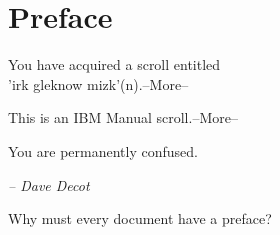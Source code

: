 

\chapter*{Preface}

\begin{flushright}
{ \ttfamily
You have acquired a scroll entitled\\
'irk gleknow mizk'(n).--More--

\medskip
This is an IBM Manual scroll.--More--

\medskip
You are permanently confused.

\bigskip
}	%
{\itshape -- Dave Decot}
\end{flushright}

Why must every document have a preface?

